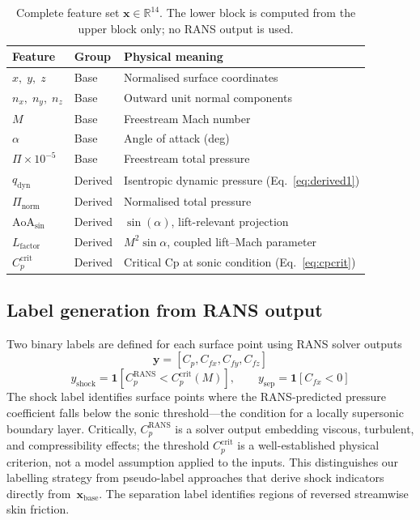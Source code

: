 \documentclass{WCCM-ECCOMAS_2026_Full_Paper}
\begin{document}
\begin{table}[ht]
\centering
\caption{Complete feature set $\mathbf{x}\in\mathbb{R}^{14}$.
  The lower block is computed from the upper block only; no RANS
  output is used.}
\label{tab:features}
\begin{tabular}{lll}
\toprule
\textbf{Feature} & \textbf{Group} & \textbf{Physical meaning} \\
\midrule
$x,\;y,\;z$        & Base & Normalised surface coordinates \\
$n_x,\;n_y,\;n_z$ & Base & Outward unit normal components \\
$M$                & Base & Freestream Mach number \\
$\alpha$           & Base & Angle of attack (deg) \\
$\Pi{\times}10^{-5}$ & Base & Freestream total pressure \\
\midrule
$q_{\mathrm{dyn}}$    & Derived & Isentropic dynamic pressure (Eq.~\ref{eq:derived1}) \\
$\Pi_{\mathrm{norm}}$ & Derived & Normalised total pressure \\
$\mathrm{AoA}_{\sin}$ & Derived & $\sin(\alpha)$, lift-relevant projection \\
$L_{\mathrm{factor}}$ & Derived & $M^{2}\sin\alpha$, coupled lift--Mach parameter \\
$C_{p}^{\mathrm{crit}}$ & Derived & Critical Cp at sonic condition (Eq.~\ref{eq:cpcrit}) \\
\bottomrule
\end{tabular}
\end{table}

\subsection{Label generation from RANS output}

Two binary labels are defined for each surface point using RANS solver
outputs \[ \mathbf{y} = [C_{p},C_{fx},C_{fy},C_{fz}] \]
\begin{equation}
  y_{\mathrm{shock}} =
    \mathbf{1}\!\left[C_{p}^{\mathrm{RANS}} < C_{p}^{\mathrm{crit}}(M)\right],
  \qquad
  y_{\mathrm{sep}} =
    \mathbf{1}\!\left[C_{fx} < 0\right]
  \label{eq:labels}
\end{equation}
The shock label identifies surface points where the RANS-predicted
pressure coefficient falls below the sonic threshold---the condition
for a locally supersonic boundary layer.  Critically,
$C_{p}^{\mathrm{RANS}}$ is a solver output embedding viscous,
turbulent, and compressibility effects; the threshold
$C_{p}^{\mathrm{crit}}$ is a well-established physical criterion, not
a model assumption applied to the inputs.  This distinguishes our
labelling strategy from pseudo-label approaches that derive shock
indicators directly from~$\mathbf{x}_{\mathrm{base}}$.  The
separation label identifies regions of reversed streamwise skin
friction.
\end{document}

